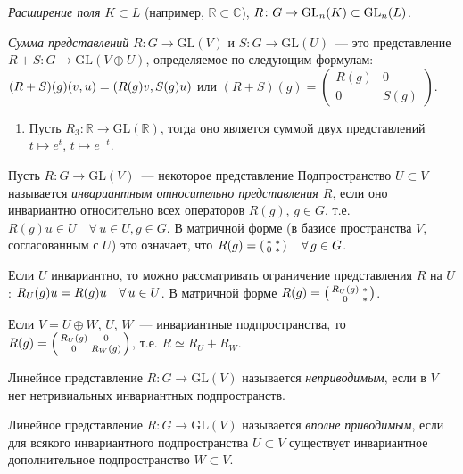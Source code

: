 \documentclass[a4paper]{article}
\newcommand*{\p}[1]{#1\nobreak\discretionary{}{\hbox{$\mathsurround=0pt #1$}}{}}
\begin{document}
\emph{Расширение поля} $K\subset L$ (например,
$\mathbb{R}\subset\mathbb{C}$), $R\colon G\to
\mathrm{GL}_n(K)\p\subset \mathrm{GL}_n(L)$.

\emph{Сумма представлений} $R\colon G\to \mathrm{GL}(V)$ и $S\colon
G\to \mathrm{GL}(U)$~--- это представление $R+S\colon G\to
\mathrm{GL}(V\oplus U)$, определяемое по следующим формулам:
$(R\p+S)(g)(v,u)=(R(g)v, S(g)u)$ или
$(R+S)(g)=\left(\begin{smallmatrix} R(g) & 0\\
0 & S(g)\end{smallmatrix}\right)$.

\prim
\begin{enumerate}
  \item Пусть $R_3\colon\mathbb{R}\to \mathrm{GL}(\mathbb{R})$, тогда оно
  является суммой двух представлений $t\mapsto e^t$, $t\mapsto e^{-t}$.
\end{enumerate}

Пусть $R\colon G\to \mathrm{GL}(V)$~--- некоторое представление
Подпространство $U\subset V$ называется \emph{инвариантным
относительно представления $R$}, если оно инвариантно относительно
всех операторов $R(g)$, $g\in G$, т.е. $R(g)u\in U\quad \forall \,
u\in U, g\in G$. В матричной форме (в базисе пространства $V$,
согласованным с $U$) это означает, что
$R(g)\p=\left(\begin{smallmatrix}* & *\\ 0 &
*\end{smallmatrix}\right)\quad \forall \, g\in G$.

Если $U$ инвариантно, то можно рассматривать ограничение
представления $R$ на $U$: $R_U(g)u\p=R(g)u\quad\forall \, u\in U$. В
матричной форме $R(g)\p=\left(\begin{smallmatrix} R_U(g) & *\\ 0 &
*\end{smallmatrix}\right)$.

Если $V=U\oplus W$, $U$, $W$~--- инвариантные подпространства, то
$R(g)\p=\left(\begin{smallmatrix} R_U(g) & 0\\ 0 &
 R_W(g)\end{smallmatrix}\right)$, т.е. $R\simeq R_U+R_W$.

Линейное представление $R\colon G\to \mathrm{GL}(V)$ называется
\emph{неприводимым}, если в $V$ нет нетривиальных инвариантных
подпространств.

Линейное представление $R\colon G\to \mathrm{GL}(V)$ называется
\emph{вполне приводимым}, если для всякого инвариантного
подпространства $U\subset V$ существует инвариантное дополнительное
подпространство $W\subset V$.
\end{document}
